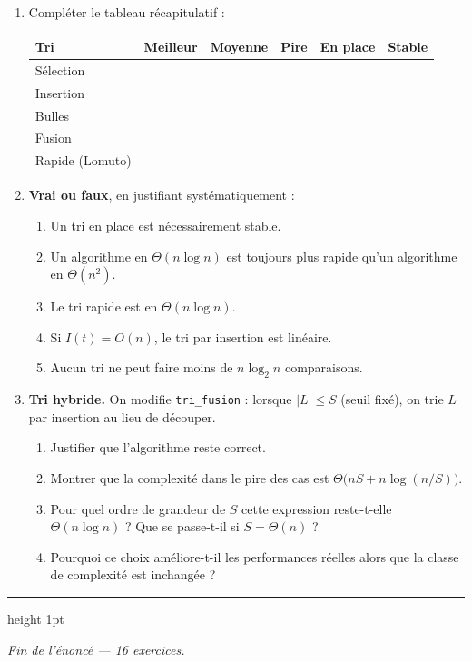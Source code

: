 \documentclass[11pt,a4paper]{article}
\begin{document}
\begin{enumerate}[label=\arabic*.,leftmargin=*]
  \item Compléter le tableau récapitulatif :
        \begin{center}\small
        \begin{tabular}{|l|c|c|c|c|c|}
        \hline
        \textbf{Tri} & \textbf{Meilleur} & \textbf{Moyenne} & \textbf{Pire} &
        \textbf{En place} & \textbf{Stable} \\\hline
        Sélection  & & & & & \\\hline
        Insertion  & & & & & \\\hline
        Bulles     & & & & & \\\hline
        Fusion     & & & & & \\\hline
        Rapide (Lomuto) & & & & & \\\hline
        \end{tabular}
        \end{center}
  \item \textbf{Vrai ou faux}, en justifiant systématiquement :
        \begin{enumerate}[label=(\alph*),itemsep=1pt]
          \item Un tri en place est nécessairement stable.
          \item Un algorithme en $\Theta(n\log n)$ est toujours plus rapide qu'un
                algorithme en $\Theta(n^2)$.
          \item Le tri rapide est en $\Theta(n\log n)$.
          \item Si $I(t)=O(n)$, le tri par insertion est linéaire.
          \item Aucun tri ne peut faire moins de $n\log_2 n$ comparaisons.
        \end{enumerate}
  \item \textbf{Tri hybride.} On modifie \texttt{tri\_fusion} : lorsque
        $|L|\le S$ (seuil fixé), on trie $L$ par insertion au lieu de découper.
        \begin{enumerate}[label=(\alph*),itemsep=1pt]
          \item Justifier que l'algorithme reste correct.
          \item Montrer que la complexité dans le pire des cas est
                $\Theta\!\big(nS + n\log(n/S)\big)$.
          \item Pour quel ordre de grandeur de $S$ cette expression reste-t-elle
                $\Theta(n\log n)$ ? Que se passe-t-il si $S=\Theta(n)$ ?
          \item Pourquoi ce choix améliore-t-il les performances réelles alors que
                la classe de complexité est inchangée ?
        \end{enumerate}
\end{enumerate}

\vspace{14pt}
{\color{teal}\hrule height 1pt}
\vspace{6pt}
\begin{center}
\small\itshape Fin de l'énoncé --- 16 exercices.
\end{center}
\end{document}

